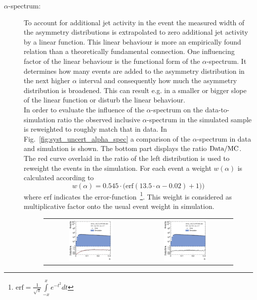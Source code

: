 \begin{description}
 \item[$\alpha$-spectrum:] To account for additional jet activity in the event the measured width of the asymmetry distributions is extrapolated to zero additional jet activity by a linear function. This linear behaviour is more an empirically found relation than a theoretically fundamental connection. One influencing factor of the linear behaviour is the functional form of the $\alpha$-spectrum. It determines how many events are added to the asymmetry distribution in the next higher $\alpha$ interval and consequently how much the asymmetry distribution is broadened. This can result e.g. in a smaller or bigger slope of the linear function or disturb the linear behaviour.\\
 In order to evaluate the influence of the $\alpha$-spectrum on the data-to-simulation ratio the observed inclusive $\alpha$-spectrum in the simulated sample is reweighted to roughly match that in data. In Fig.~\ref{fig:syst_uncert_alpha_spec} a comparison of the $\alpha$-spectrum in data and simulation is shown. The bottom part displays the ratio $\rm{Data/MC}$. The red curve overlaid in the ratio of the left distribution is used to reweight the events in the simulation. For each event a weight $w(\alpha)$ is calculated according to 
\begin{equation}
w(\alpha) = 0.545 \cdot \mathrm{(erf}(13.5 \cdot \alpha -0.02) +1))
\end{equation}
where erf indicates the error-function~\footnote{ $\mathrm{erf} = \frac{1}{\sqrt{\pi}} \int\limits_{-x}^{x} e^{-t^2} dt$}. This weight is considered as multiplicative factor onto the usual event weight in simulation. 
 \begin{figure}[tp]
  \centering
  \begin{tabular}{cc}
                \includegraphics[width=0.49\textwidth]{figures/Alpha__AfterAsymmHistos.pdf} &
                \includegraphics[width=0.49\textwidth]{figures/AfterReweight_Alpha__AfterAsymmHistos.pdf}

\end{tabular}
\end{figure}
\end{description}
